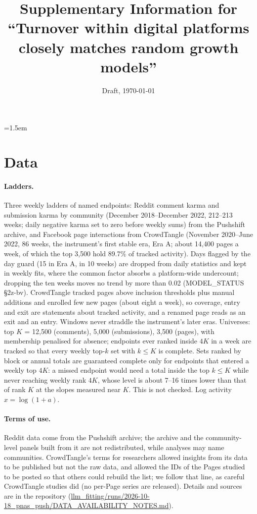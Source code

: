 \documentclass[10pt]{article}
\title{Supplementary Information for\\ ``Turnover within digital platforms closely matches random growth models''}
\date{Draft, \today}
\begin{document}
\emergencystretch=1.5em
\maketitle
\tableofcontents

\section{Data}
\paragraph{Ladders.} Three weekly ladders of named endpoints: Reddit comment karma and submission karma by community (December 2018--December 2022, 212--213 weeks; daily negative karma set to zero before weekly sums) from the Pushshift archive, and Facebook page interactions from CrowdTangle (November 2020--June 2022, 86 weeks, the instrument's first stable era, Era A; about 14,400 pages a week, of which the top 3,500 hold 89.7\% of tracked activity). Days flagged by the day guard (15 in Era A, in 10 weeks) are dropped from daily statistics and kept in weekly fits, where the common factor absorbs a platform-wide undercount; dropping the ten weeks moves no trend by more than 0.02 (MODEL\_STATUS \S2z-bv). CrowdTangle tracked pages above inclusion thresholds plus manual additions and enrolled few new pages (about eight a week), so coverage, entry and exit are statements about tracked activity, and a renamed page reads as an exit and an entry. Windows never straddle the instrument's later eras. Universes: top $K$ = 12,500 (comments), 5,000 (submissions), 3,500 (pages), with membership penalised for absence; endpoints ever ranked inside $4K$ in a week are tracked so that every weekly top-$k$ set with $k \le K$ is complete. Sets ranked by block or annual totals are guaranteed complete only for endpoints that entered a weekly top $4K$: a missed endpoint would need a total inside the top $k \le K$ while never reaching weekly rank $4K$, whose level is about 7--16 times lower than that of rank $K$ at the slopes measured near $K$. This is not checked. Log activity $x=\log(1+a)$.
\paragraph{Terms of use.} Reddit data come from the Pushshift archive; the archive and the community-level panels built from it are not redistributed, while analyses may name communities. CrowdTangle's terms for researchers allowed insights from its data to be published but not the raw data, and allowed the IDs of the Pages studied to be posted so that others could rebuild the list; we follow that line, as careful CrowdTangle studies did (no per-Page series are released). Details and sources are in the repository (\url{llm_fitting/runs/2026-10-18_pnas_push/DATA_AVAILABILITY_NOTES.md}).
\end{document}
